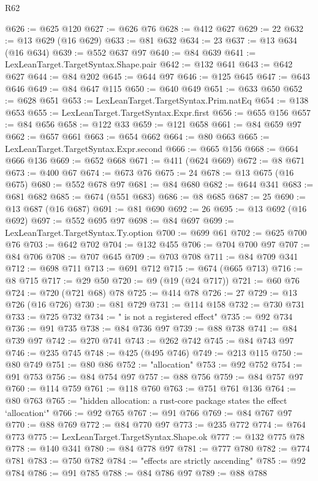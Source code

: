 \begin{lexlean}{R62}
\begin{coremodule}
@626 := @625 @120
@627 := @626 @76
@628 := @412 @627
@629 := 22
@632 := @13 @629 (@16 @629)
@633 := @81 @632
@634 := 23
@637 := @13 @634 (@16 @634)
@639 := @552 @637 @97
@640 := @84 @639
@641 := LexLeanTarget.TargetSyntax.Shape.pair
@642 := @132 @641
@643 := @642 @627
@644 := @84 @202
@645 := @644 @97
@646 := @125 @645
@647 := @643 @646
@649 := @84 @647 @115
@650 := @640 @649
@651 := @633 @650
@652 := @628 @651
@653 := LexLeanTarget.TargetSyntax.Prim.natEq
@654 := @138 @653
@655 := LexLeanTarget.TargetSyntax.Expr.first
@656 := @655 @156
@657 := @84 @656
@658 := @122 @33
@659 := @121 @658
@661 := @84 @659 @97
@662 := @657 @661
@663 := @654 @662
@664 := @80 @663
@665 := LexLeanTarget.TargetSyntax.Expr.second
@666 := @665 @156
@668 := @664 @666 @136
@669 := @652 @668
@671 := @411 (@624 @669)
@672 := @8 @671
@673 := @400 @67
@674 := @673 @76
@675 := 24
@678 := @13 @675 (@16 @675)
@680 := @552 @678 @97
@681 := @84 @680
@682 := @644 @341
@683 := @681 @682
@685 := @674 (@551 @683)
@686 := @8 @685
@687 := 25
@690 := @13 @687 (@16 @687)
@691 := @81 @690
@692 := 26
@695 := @13 @692 (@16 @692)
@697 := @552 @695 @97
@698 := @84 @697
@699 := LexLeanTarget.TargetSyntax.Ty.option
@700 := @699 @61
@702 := @625 @700 @76
@703 := @642 @702
@704 := @132 @455
@706 := @704 @700 @97
@707 := @84 @706
@708 := @707 @645
@709 := @703 @708
@711 := @84 @709 @341
@712 := @698 @711
@713 := @691 @712
@715 := @674 (@665 @713)
@716 := @8 @715
@717 := @29 @50
@720 := @9 (@19 (@24 @717))
@721 := @60 @76
@724 := @720 (@721 @68) @78
@725 := @414 @78
@726 := 27
@729 := @13 @726 (@16 @726)
@730 := @81 @729
@731 := @114 @158
@732 := @730 @731
@733 := @725 @732
@734 := " is not a registered effect"
@735 := @92 @734
@736 := @91 @735
@738 := @84 @736 @97
@739 := @88 @738
@741 := @84 @739 @97
@742 := @270 @741
@743 := @262 @742
@745 := @84 @743 @97
@746 := @235 @745
@748 := @425 (@495 @746)
@749 := @213 @115
@750 := @80 @749
@751 := @80 @86
@752 := "allocation"
@753 := @92 @752
@754 := @91 @753
@756 := @84 @754 @97
@757 := @88 @756
@759 := @84 @757 @97
@760 := @114 @759
@761 := @118 @760
@763 := @751 @761 @136
@764 := @80 @763
@765 := "hidden allocation: a rust-core package states the effect `allocation`"
@766 := @92 @765
@767 := @91 @766
@769 := @84 @767 @97
@770 := @88 @769
@772 := @84 @770 @97
@773 := @235 @772
@774 := @764 @773
@775 := LexLeanTarget.TargetSyntax.Shape.ok
@777 := @132 @775 @78
@778 := @140 @341
@780 := @84 @778 @97
@781 := @777 @780
@782 := @774 @781
@783 := @750 @782
@784 := "effects are strictly ascending"
@785 := @92 @784
@786 := @91 @785
@788 := @84 @786 @97
@789 := @88 @788

\end{coremodule}
\end{lexlean}
